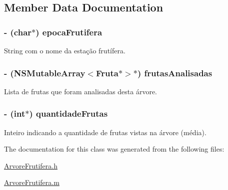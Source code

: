 \subsection{Member Data Documentation}
\hypertarget{interface_arvore_frutifera_a0e22588b833e760b868e05dc2e3c7af9}{}
\subsubsection[{epoca\+Frutifera}]{\setlength{\rightskip}{0pt plus 5cm}-\/ (char$\ast$) epoca\+Frutifera\hspace{0.3cm}{\ttfamily [protected]}}\label{interface_arvore_frutifera_a0e22588b833e760b868e05dc2e3c7af9}


String com o nome da estação frutífera. 

\hypertarget{interface_arvore_frutifera_ae837cbe18a17ea2d500517ab72ce818f}{}
\subsubsection[{frutas\+Analisadas}]{\setlength{\rightskip}{0pt plus 5cm}-\/ (N\+S\+Mutable\+Array$<${\bf Fruta}$\ast$$>$$\ast$) frutas\+Analisadas\hspace{0.3cm}{\ttfamily [protected]}}\label{interface_arvore_frutifera_ae837cbe18a17ea2d500517ab72ce818f}


Lista de frutas que foram analisadas desta árvore. 

\hypertarget{interface_arvore_frutifera_aa0f26437071d5fc42bb990c9c49906be}{}
\subsubsection[{quantidade\+Frutas}]{\setlength{\rightskip}{0pt plus 5cm}-\/ (int$\ast$) quantidade\+Frutas\hspace{0.3cm}{\ttfamily [protected]}}\label{interface_arvore_frutifera_aa0f26437071d5fc42bb990c9c49906be}


Inteiro indicando a quantidade de frutas vistas na árvore (média). 



The documentation for this class was generated from the following files\+:\begin{DoxyCompactItemize}
\item 
\hyperlink{_arvore_frutifera_8h}{Arvore\+Frutifera.\+h}\item 
\hyperlink{_arvore_frutifera_8m}{Arvore\+Frutifera.\+m}\end{DoxyCompactItemize}
